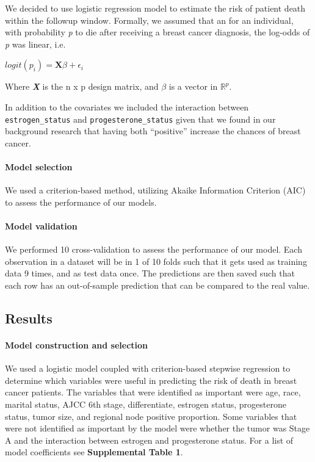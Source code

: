 \documentclass[
]{article}
\begin{document}
We decided to use logistic regression model to estimate the risk of
patient death within the followup window. Formally, we assumed that an
for an individual, with probability \emph{p} to die after receiving a
breast cancer diagnosis, the log-odds of \emph{p} was linear, i.e.

\(logit(p_i) = \mathbf{X}\beta+ \epsilon_i\)

Where \textbf{\emph{X}} is the n x p design matrix, and \(\beta\) is a
vector in \(\mathbb{R}^p\).

In addition to the covariates we included the interaction between
\texttt{estrogen\_status} and \texttt{progesterone\_status} given that
we found in our background research that having both ``positive''
increase the chances of breast cancer.

\hypertarget{model-selection}{%
\paragraph{Model selection}\label{model-selection}}

We used a criterion-based method, utilizing Akaike Information Criterion
(AIC) to assess the performance of our models.

\hypertarget{model-validation}{%
\paragraph{Model validation}\label{model-validation}}

We performed 10 cross-validation to assess the performance of our model.
Each observation in a dataset will be in 1 of 10 folds such that it gets
used as training data 9 times, and as test data once. The predictions
are then saved such that each row has an out-of-sample prediction that
can be compared to the real value.

\hypertarget{results}{%
\subsection{Results}\label{results}}

\hypertarget{model-construction-and-selection}{%
\paragraph{Model construction and
selection}\label{model-construction-and-selection}}

We used a logistic model coupled with criterion-based stepwise
regression to determine which variables were useful in predicting the
risk of death in breast cancer patients. The variables that were
identified as important were age, race, marital status, AJCC 6th stage,
differentiate, estrogen status, progesterone status, tumor size, and
regional node positive proportion. Some variables that were not
identified as important by the model were whether the tumor was Stage A
and the interaction between estrogen and progesterone status. For a list
of model coefficients see \textbf{Supplemental Table 1}.
\end{document}
